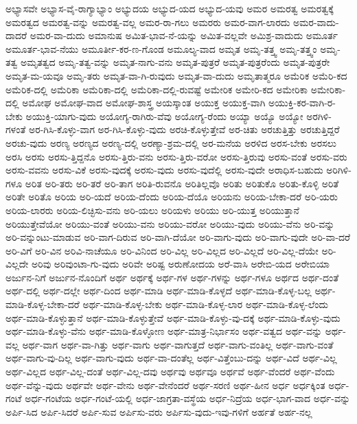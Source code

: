 {ಅಭ್ಯಾಸವೇ
ಅಭ್ಯಾಸ-ವೈ-ರಾಗ್ಯಾಭ್ಯಾಂ
ಅಭ್ಯುದಯ
ಅಭ್ಯುದ-ಯದ
ಅಭ್ಯುದ-ಯವು
ಅಮರ
ಅಮರತ್ವ
ಅಮರತ್ವಕ್ಕೆ
ಅಮರತ್ವದ
ಅಮರತ್ವ-ವನ್ನು
ಅಮರತ್ವ-ವಲ್ಲ
ಅಮರ-ರಾ-ಗಲು
ಅಮರರು
ಅಮರ-ವಾಗ-ಲಾರದು
ಅಮರ-ವಾದು-ದಾದರೆ
ಅಮರ-ವಾ-ದುದು
ಅಮಾನುಷ
ಅಮಿತ-ಭಾವ-ನೆ-ಯನ್ನು
ಅಮಿತ-ವಲ್ಲವೇ
ಅಮಿಶ್ರ-ವಾದುದು
ಅಮೂರ್ತ
ಅಮೂರ್ತ-ಭಾವ-ನೆಯು
ಅಮೂರ್ತೀ-ಕರ-ಣ-ಗೊಂಡ
ಅಮೂಲ್ಯ-ವಾದ
ಅಮೃತ
ಅಮೃ-ತತ್ತ್ವ
ಅಮೃ-ತತ್ತ್ವಂ
ಅಮೃ-ತತ್ವ
ಅಮೃತತ್ವದ
ಅಮೃ-ತತ್ವ-ವನ್ನು
ಅಮೃತ-ನಾಗು-ವನು
ಅಮೃತ-ಪುತ್ರರೆ
ಅಮೃತ-ಪುತ್ರರೆಂದು
ಅಮೃತ-ಪುತ್ರರೇ
ಅಮೃತ-ಮ-ಯವೂ
ಅಮೃ-ತರು
ಅಮೃತ-ವಾ-ಗಿ-ರುವುದು
ಅಮೃತ-ವಾ-ದುದು
ಅಮೃತಾತ್ಮರೂ
ಅಮೆರಿಕ
ಅಮೆರಿ-ಕದ
ಅಮೆರಿಕ-ದಲ್ಲಿ
ಅಮೆರಿಕಾ
ಅಮೆರಿಕಾ-ದಲ್ಲಿ
ಅಮೆರಿಕಾ-ದಲ್ಲಿ-ರುವಷ್ಟೆ
ಅಮೇರಿಕ
ಅಮೇರಿ-ಕದ
ಅಮೇರಿಕಾ
ಅಮೇರಿಕಾ-ದಲ್ಲಿ
ಅಮೋಘ
ಅಮೋಘ-ವಾದ
ಅಮೋಘ-ಶಾಸ್ತ್ರ
ಅಯಸ್ಕಾಂತ
ಅಯುಕ್ತ
ಅಯುಕ್ತ-ವಾಗಿ
ಅಯುಕ್ತಿ-ಕರ-ವಾಗಿ-ರ-ಬೇಕು
ಅಯುಕ್ತಿ-ಯಾಗು-ವುದು
ಅಯೋಗ್ಯ-ರಾಗಿರು-ವೆವು
ಅಯೋಗ್ಯ-ರೆಂದು
ಅಯ್ಯಾ
ಅಯ್ಯೊ
ಅಯ್ಯೋ
ಅರಗಿಳಿ-ಗಳಂತೆ
ಅರ-ಗಿಸಿ-ಕೊಳ್ಳು-ವಾಗ
ಅರ-ಗಿಸಿ-ಕೊಳ್ಳು-ವುದು
ಅರಚಿ-ಕೊಳ್ಳುತ್ತೇವೆ
ಅರ-ಚಿತು
ಅರಚುತ್ತಿತ್ತು
ಅರಚುತ್ತಿದ್ದರೆ
ಅರಚು-ವುದು
ಅರಣ್ಯ
ಅರಣ್ಯದ
ಅರಣ್ಯ-ದಲ್ಲಿ
ಅರಣ್ಯಾ-ಶ್ರಮ-ದಲ್ಲಿ
ಅರ-ಮನೆಯ
ಅರಳಿದ
ಅರಸ-ಬೇಕು
ಅರಸಲು
ಅರಸಿ
ಅರಸು
ಅರಸು-ತ್ತಿದ್ದನೊ
ಅರಸು-ತ್ತಿರು-ವನು
ಅರಸು-ತ್ತಿರು-ವರೋ
ಅರಸು-ತ್ತಿರುವು
ಅರಸು-ವಂತೆ
ಅರಸು-ವರು
ಅರಸು-ವವನು
ಅರಸು-ವಿಕೆ
ಅರಸು-ವುದಕ್ಕೆ
ಅರಸು-ವುದು
ಅರಸು-ವುದೆಲ್ಲಿ
ಅರಸು-ವುದೇ
ಅರಾಧಿಸ-ಬಹುದು
ಅರಿಗಿಳಿ-ಗಳೂ
ಅರಿತ
ಅರಿ-ತರು
ಅರಿ-ತರೆ
ಅರಿ-ತಾಗ
ಅರಿತಿ-ರುವನೊ
ಅರಿತಿಲ್ಲವೊ
ಅರಿತು
ಅರಿತುಕೊ
ಅರಿತು-ಕೊಳ್ಳಿ
ಅರಿತೆ
ಅರಿತೇ
ಅರಿತೊ
ಅರಿಯ
ಅರಿ-ಯದೆ
ಅರಿಯ-ದೆಂದು
ಅರಿಯ-ದೆಯೊ
ಅರಿಯನು
ಅರಿಯ-ಬೇಕಾ-ದರೆ
ಅರಿ-ಯರು
ಅರಿಯ-ಲಾರರು
ಅರಿಯ-ಲಿಚ್ಛಿಸು-ವನು
ಅರಿ-ಯಲು
ಅರಿಯಳು
ಅರಿಯು
ಅರಿ-ಯುತ್ತ
ಅರಿಯುತ್ತಾನೆ
ಅರಿಯುತ್ತೇವೆಯೋ
ಅರಿಯು-ವಂತೆ
ಅರಿಯು-ವನು
ಅರಿಯು-ವರೋ
ಅರಿಯು-ವುದು
ಅರಿಯು-ವೆನು
ಅರಿ-ವನ್ನು
ಅರಿ-ವನ್ನುಂಟು-ಮಾಡುವ
ಅರಿ-ವಾಗ-ದಿರುವ
ಅರಿ-ವಾಗಿ-ದೆಯೋ
ಅರಿ-ವಾಗು-ವುದು
ಅರಿ-ವಾಗು-ವುದೇ
ಅರಿ-ವಾ-ದರೆ
ಅರಿ-ವಿಗೆ
ಅರಿ-ವಿನ
ಅರಿವಿ-ನಾಚೆಯೂ
ಅರಿ-ವಿನಿಂದ
ಅರಿ-ವಿಲ್ಲ
ಅರಿ-ವಿಲ್ಲದ
ಅರಿ-ವಿಲ್ಲದೆ
ಅರಿ-ವಿಲ್ಲ-ದೆಯೇ
ಅರಿ-ವಿಲ್ಲದೇ
ಅರಿವು
ಅರಿವುಂಟಾ-ಗು-ವುದು
ಅರಿವೇ
ಅರಿಷ್ಟ
ಅರುಣೋದಯ
ಅರೆ-ವಾಸಿ
ಅರೇಬಿ-ಯದ
ಅರೇಬಿಯಾ
ಅರ್ಜುನ-ನಿಗೆ
ಅರ್ಜುನ-ನೊಂದಿಗೆ
ಅರ್ಥ
ಅರ್ಥಕ್ಕೆ
ಅರ್ಥ-ಗಳ
ಅರ್ಥ-ಗಳನ್ನು
ಅರ್ಥ-ಗಳೂ
ಅರ್ಥದ
ಅರ್ಥ-ದಂತೆ
ಅರ್ಥ-ದಲ್ಲಿ
ಅರ್ಥ-ದಲ್ಲೇ
ಅರ್ಥ-ದಿಂದ
ಅರ್ಥ-ಮಾಡಿ
ಅರ್ಥ-ಮಾಡಿ-ಕೊಳ್ಳದೆ
ಅರ್ಥ-ಮಾಡಿ-ಕೊಳ್ಳ-ಬಲ್ಲ
ಅರ್ಥ-ಮಾಡಿ-ಕೊಳ್ಳ-ಬೇಕಾ-ದರೆ
ಅರ್ಥ-ಮಾಡಿ-ಕೊಳ್ಳ-ಬೇಕು
ಅರ್ಥ-ಮಾಡಿ-ಕೊಳ್ಳ-ಲಾರ
ಅರ್ಥ-ಮಾಡಿ-ಕೊಳ್ಳ-ಲೆಂದು
ಅರ್ಥ-ಮಾಡಿ-ಕೊಳ್ಳುತ್ತಾನೆ
ಅರ್ಥ-ಮಾಡಿ-ಕೊಳ್ಳುತ್ತೇವೆ
ಅರ್ಥ-ಮಾಡಿ-ಕೊಳ್ಳು-ವು-ದಕ್ಕೆ
ಅರ್ಥ-ಮಾಡಿ-ಕೊಳ್ಳು-ವುದು
ಅರ್ಥ-ಮಾಡಿ-ಕೊಳ್ಳು-ವೆನು
ಅರ್ಥ-ಮಾಡಿ-ಕೊಳ್ಳೋಣ
ಅರ್ಥ-ಮಾತ್ರ-ನಿರ್ಭಾಸಂ
ಅರ್ಥ-ವತ್ವದ
ಅರ್ಥ-ವನ್ನು
ಅರ್ಥ-ವಲ್ಲ
ಅರ್ಥ-ವಾಗ
ಅರ್ಥ-ವಾ-ಗಿತ್ತು
ಅರ್ಥ-ವಾಗು
ಅರ್ಥ-ವಾಗುತ್ತದೆ
ಅರ್ಥ-ವಾಗು-ವಂತಿಲ್ಲ
ಅರ್ಥ-ವಾಗು-ವಂತೆ
ಅರ್ಥ-ವಾಗು-ವು-ದಿಲ್ಲ
ಅರ್ಥ-ವಾಗು-ವುದು
ಅರ್ಥ-ವಾ-ದಂತೆಲ್ಲ
ಅರ್ಥ-ವಿತ್ತೆಂಬು-ದನ್ನು
ಅರ್ಥ-ವಿದೆ
ಅರ್ಥ-ವಿಲ್ಲ
ಅರ್ಥ-ವಿಲ್ಲದ
ಅರ್ಥ-ವಿಲ್ಲ-ದಂತೆ
ಅರ್ಥ-ವಿಲ್ಲ-ದವು
ಅರ್ಥವು
ಅರ್ಥವೂ
ಅರ್ಥವೆ
ಅರ್ಥ-ವೆಂದರೆ
ಅರ್ಥ-ವೆಂದು
ಅರ್ಥ-ವೆನ್ನು-ವುದು
ಅರ್ಥವೇ
ಅರ್ಥ-ವೇನು
ಅರ್ಥ-ವೇನೆಂದರೆ
ಅರ್ಥ-ಸರಣಿ
ಅರ್ಥ-ಹೀನ
ಅರ್ಧ
ಅರ್ಧಕ್ಕಿಂತ
ಅರ್ಧ-ಗಂಟೆ
ಅರ್ಧ-ಗಂಟೆಯ
ಅರ್ಧ-ಗಂಟೆ-ಯಲ್ಲಿ
ಅರ್ಧ-ಜಾಗ್ರತಾ-ವಸ್ಥೆಯ
ಅರ್ಧ-ನಿದ್ರೆಯ
ಅರ್ಧ-ಭಾಗ-ವಾದ
ಅರ್ಧ-ವನ್ನು
ಅರ್ಪಿ-ಸಿದ
ಅರ್ಪಿ-ಸಿದರೆ
ಅರ್ಪಿ-ಸುವ
ಅರ್ಪಿಸು-ವರು
ಅರ್ಪಿಸು-ವುದು-ಇವು-ಗಳಿಗೆ
ಅರ್ಹತೆ
ಅರ್ಹ-ನಲ್ಲ
}

